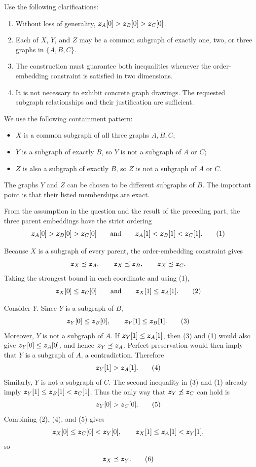 Use the following clarifications:
\begin{enumerate}
  \item Without loss of generality,
    \(\bm{z}_A[0]>\bm{z}_B[0]>\bm{z}_C[0]\).
  \item Each of \(X\), \(Y\), and \(Z\) may be a common subgraph of exactly one,
    two, or three graphs in \(\{A,B,C\}\).
  \item The construction must guarantee both inequalities whenever the
    order-embedding constraint is satisfied in two dimensions.
  \item It is not necessary to exhibit concrete graph drawings. The requested
    subgraph relationships and their justification are sufficient.
\end{enumerate}

\begin{solution}
We use the following containment pattern:
\begin{itemize}
  \item \(X\) is a common subgraph of all three graphs \(A,B,C\);
  \item \(Y\) is a subgraph of exactly \(B\), so \(Y\) is not a subgraph of
    \(A\) or \(C\);
  \item \(Z\) is also a subgraph of exactly \(B\), so \(Z\) is not a
    subgraph of \(A\) or \(C\).
\end{itemize}
The graphs \(Y\) and \(Z\) can be chosen to be different subgraphs of \(B\).
The important point is that their listed memberships are exact.

From the assumption in the question and the result of the preceding part,
the three parent embeddings have the strict ordering
\[
  \bm{z}_A[0]>\bm{z}_B[0]>\bm{z}_C[0]
  \qquad\text{and}\qquad
  \bm{z}_A[1]<\bm{z}_B[1]<\bm{z}_C[1].
  \tag{1}
\]

Because \(X\) is a subgraph of every parent, the order-embedding constraint
gives
\[
  \bm{z}_X\preceq\bm{z}_A,\qquad
  \bm{z}_X\preceq\bm{z}_B,\qquad
  \bm{z}_X\preceq\bm{z}_C.
\]
Taking the strongest bound in each coordinate and using (1),
\[
  \bm{z}_X[0]\leq\bm{z}_C[0]
  \qquad\text{and}\qquad
  \bm{z}_X[1]\leq\bm{z}_A[1].
  \tag{2}
\]

Consider \(Y\). Since \(Y\) is a subgraph of \(B\),
\[
  \bm{z}_Y[0]\leq\bm{z}_B[0],
  \qquad
  \bm{z}_Y[1]\leq\bm{z}_B[1].
  \tag{3}
\]
Moreover, \(Y\) is not a subgraph of \(A\). If
\(\bm{z}_Y[1]\leq\bm{z}_A[1]\), then (3) and (1) would also give
\(\bm{z}_Y[0]\leq\bm{z}_A[0]\), and hence
\(\bm{z}_Y\preceq\bm{z}_A\). Perfect preservation would then imply that
\(Y\) is a subgraph of \(A\), a contradiction. Therefore
\[
  \bm{z}_Y[1]>\bm{z}_A[1].
  \tag{4}
\]
Similarly, \(Y\) is not a subgraph of \(C\). The second inequality in (3)
and (1) already imply
\(\bm{z}_Y[1]\leq\bm{z}_B[1]<\bm{z}_C[1]\). Thus the only way that
\(\bm{z}_Y\not\preceq\bm{z}_C\) can hold is
\[
  \bm{z}_Y[0]>\bm{z}_C[0].
  \tag{5}
\]
Combining (2), (4), and (5) gives
\[
  \bm{z}_X[0]\leq\bm{z}_C[0]<\bm{z}_Y[0],
  \qquad
  \bm{z}_X[1]\leq\bm{z}_A[1]<\bm{z}_Y[1],
\]
so
\[
  \bm{z}_X\preceq\bm{z}_Y.
  \tag{6}
\]


\end{solution}
